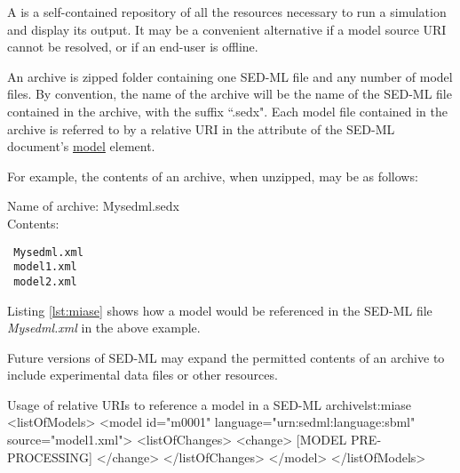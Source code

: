 \label{sec:archive} 
A  is a self-contained repository of all the resources necessary to run a simulation and display its output. It may be a convenient alternative if a model  source URI cannot be resolved,  or if an end-user is offline. 

An archive is zipped folder containing one SED-ML file and any number of model files. By convention,
 the name of the archive will be the name of the SED-ML file contained in the archive, with the suffix ``.sedx". Each model file contained in the archive is  referred to  by a relative URI  in the  attribute of the SED-ML document's  \hyperref[class:model]{model} element.
 
 For example, the contents of  an archive, when unzipped, may be as follows:
 
 Name of archive: Mysedml.sedx\\
 Contents: 
 \begin{verbatim}
 Mysedml.xml
 model1.xml
 model2.xml
 \end{verbatim}
 Listing \ref{lst:miase} shows how a model would be referenced in the SED-ML file \emph{Mysedml.xml} in the above example.
 
 Future versions of SED-ML may expand the permitted contents of an archive to include experimental data files or other resources.
%
\begin{myXmlLst}{Usage of relative URIs to reference a model in a SED-ML archive}{lst:miase}
<listOfModels>
 <model id="m0001" language="urn:sedml:language:sbml" 
  source="model1.xml">
  <listOfChanges>
   <change>
    [MODEL PRE-PROCESSING]
   </change>
   </listOfChanges> 
 </model>
</listOfModels>
\end{myXmlLst} 
%




